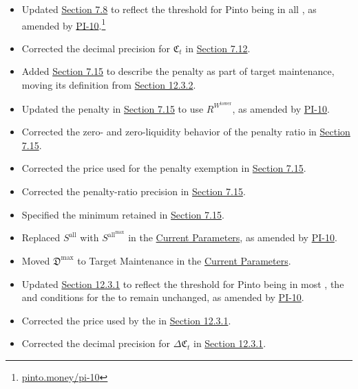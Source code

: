 \documentclass[class=article, crop=false]{standalone}
\begin{document}
\begin{itemize}[topsep=0pt, itemsep=3pt,leftmargin=16pt]
    \begin{itemize}
        \item Updated \hyperlink{subsection.7.8}{Section 7.8} to reflect the threshold for Pinto being  in all , as amended by \href{https://pinto.money/pi-10}{PI-10}.\footnote{\href{https://pinto.money/pi-10}{pinto.money/pi-10}}
        \item Corrected the decimal precision for $\mathfrak{C}_t$ in \hyperlink{subsection.7.12}{Section 7.12}.
        \item Added \hyperref[sec:mown-stalk-penalty]{Section 7.15} to describe the  penalty as part of target maintenance, moving its definition from \hyperlink{subsubsection.12.3.2}{Section 12.3.2}.
        \item Updated the  penalty in \hyperref[sec:mown-stalk-penalty]{Section 7.15} to use $R^{W^{\text{lower}}}$, as amended by \href{https://pinto.money/pi-10}{PI-10}.
        \item Corrected the zero- and zero-liquidity behavior of the  penalty ratio in \hyperref[sec:mown-stalk-penalty]{Section 7.15}.
        \item Corrected the price used for the  penalty exemption in \hyperref[sec:mown-stalk-penalty]{Section 7.15}.
        \item Corrected the penalty-ratio precision in \hyperref[sec:mown-stalk-penalty]{Section 7.15}.
        \item Specified the minimum retained  in \hyperref[sec:mown-stalk-penalty]{Section 7.15}.
        \item Replaced $S^{\text{all}}$ with $S^{\text{all}^{\text{max}}}$ in the \hyperlink{subsection.12.1}{Current Parameters}, as amended by \href{https://pinto.money/pi-10}{PI-10}.
        \item Moved $\mathfrak{D}^{\text{max}}$ to Target Maintenance in the \hyperlink{subsection.12.1}{Current Parameters}.
        \item Updated \hyperlink{subsubsection.12.3.1}{Section 12.3.1} to reflect the threshold for Pinto being  in most , the  and conditions for the  to remain unchanged, as amended by \href{https://pinto.money/pi-10}{PI-10}.
        \item Corrected the price used by the  in \hyperlink{subsubsection.12.3.1}{Section 12.3.1}.
        \item Corrected the decimal precision for $\Delta\mathfrak{C}_t$ in \hyperlink{subsubsection.12.3.1}{Section 12.3.1}.

\end{itemize}
\end{itemize}
\end{document}
